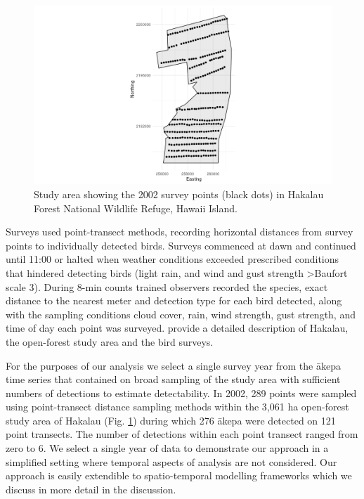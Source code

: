 \documentclass[preprint,12pt]{elsarticle}
\newcommand{\akepa}{\textquotesingle\={a}kepa}  %
\newcommand{\hawaii}{Hawai\textquotesingle i}   %
\begin{document}
\begin{figure}
	\centering
	\includegraphics[scale=0.5]{figures/study_area_design.png}
	\caption{Study area showing the 2002 survey points (black dots) in Hakalau Forest National Wildlife Refuge, \hawaii{} Island.}
	\label{fig:2002studyareapointspt}
\end{figure}

Surveys used point-transect methods, recording horizontal distances from survey points to individually detected birds. Surveys commenced at dawn and continued until 11:00 or halted when weather conditions exceeded prescribed conditions that hindered detecting birds (light rain, and wind and gust strength \textgreater Baufort scale 3). During 8-min counts trained observers recorded the species, exact distance to the nearest meter and detection type for each bird detected, along with the sampling conditions cloud cover, rain, wind strength, gust strength, and time of day each point was surveyed.   \cite{camp_population_2010,camp_statespace_2016} provide a detailed description of Hakalau, the open-forest study area and the bird surveys.

For the purposes of our analysis we select a single survey year from the \akepa{} time series that contained on broad sampling of the study area with sufficient numbers of detections to estimate detectability. In 2002, 289 points were sampled using point-transect distance sampling methods within the 3,061 ha open-forest study area of Hakalau (Fig. \ref{fig:2002studyareapointspt}) during which 276 \akepa{} were detected on 121 point transects. The number of detections within each point transect ranged from zero to 6. We select a single year of data to demonstrate our approach in a simplified setting where temporal aspects of analysis are not considered.  Our approach is easily extendible to spatio-temporal modelling frameworks which we discuss in more detail in the discussion.
\end{document}
